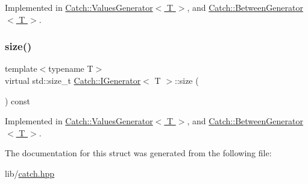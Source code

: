 Implemented in \hyperlink{class_catch_1_1_values_generator_a9674c8b70d562d2d68154de92dd1810a}{Catch\+::\+Values\+Generator$<$ T $>$}, and \hyperlink{class_catch_1_1_between_generator_a913f74bb0c23b3bc0127abfffdabbd94}{Catch\+::\+Between\+Generator$<$ T $>$}.

\hypertarget{struct_catch_1_1_i_generator_a2e317253b03e838b6065ce69719a198e}{}\label{struct_catch_1_1_i_generator_a2e317253b03e838b6065ce69719a198e} 
\subsubsection{\texorpdfstring{size()}{size()}}
{\footnotesize\ttfamily template$<$typename T$>$ \\
virtual std\+::size\+\_\+t \hyperlink{struct_catch_1_1_i_generator}{Catch\+::\+I\+Generator}$<$ T $>$\+::size (\begin{DoxyParamCaption}{ }\end{DoxyParamCaption}) const\hspace{0.3cm}{\ttfamily [pure virtual]}}



Implemented in \hyperlink{class_catch_1_1_values_generator_a9aa5b140ee502975cf35115e534ab771}{Catch\+::\+Values\+Generator$<$ T $>$}, and \hyperlink{class_catch_1_1_between_generator_af65a1fe51f9b1106fc676e3dd189adb6}{Catch\+::\+Between\+Generator$<$ T $>$}.



The documentation for this struct was generated from the following file\+:\begin{DoxyCompactItemize}
\item 
lib/\hyperlink{catch_8hpp}{catch.\+hpp}\end{DoxyCompactItemize}
